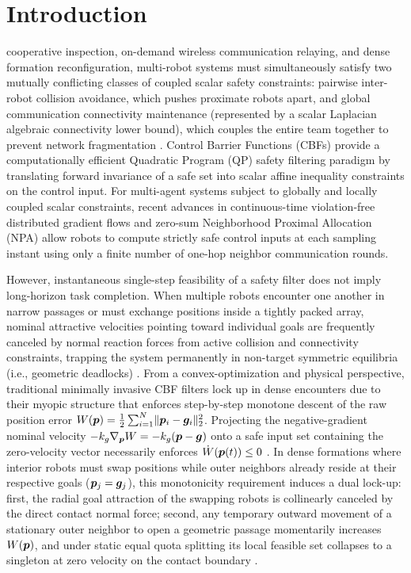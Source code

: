 \section{Introduction}\label{sec:intro}

 cooperative inspection, on-demand wireless communication relaying, and dense formation reconfiguration, multi-robot systems must simultaneously satisfy two mutually conflicting classes of coupled scalar safety constraints: pairwise inter-robot collision avoidance, which pushes proximate robots apart, and global communication connectivity maintenance (represented by a scalar Laplacian algebraic connectivity lower bound), which couples the entire team together to prevent network fragmentation \cite{yang2010decentralized,sabattini2013decentralized,ong2021connectivity}. Control Barrier Functions (CBFs) \cite{ames2017cbf,breeden2022sampled} provide a computationally efficient Quadratic Program (QP) safety filtering paradigm by translating forward invariance of a safe set into scalar affine inequality constraints on the control input. For multi-agent systems subject to globally and locally coupled scalar constraints, recent advances in continuous-time violation-free distributed gradient flows \cite{tan2025violationfree} and zero-sum Neighborhood Proximal Allocation (NPA) allow robots to compute strictly safe control inputs at each sampling instant using only a finite number of one-hop neighbor communication rounds.

However, instantaneous single-step feasibility of a safety filter does not imply long-horizon task completion. When multiple robots encounter one another in narrow passages or must exchange positions inside a tightly packed array, nominal attractive velocities pointing toward individual goals are frequently canceled by normal reaction forces from active collision and connectivity constraints, trapping the system permanently in non-target symmetric equilibria (i.e., geometric deadlocks) \cite{reis2021,grover2023deadlock,tan2024equilibria,mestres2026filters}. From a convex-optimization and physical perspective, traditional minimally invasive CBF filters lock up in dense encounters due to their myopic structure that enforces step-by-step monotone descent of the raw position error $W(\boldsymbol{p})=\frac12\sum_{i=1}^N\lVert\boldsymbol{p}_i-\boldsymbol{g}_i\rVert_2^2$. Projecting the negative-gradient nominal velocity $-k_g\nabla_{\boldsymbol{p}}W=-k_g(\boldsymbol{p}-\boldsymbol{g})$ onto a safe input set containing the zero-velocity vector necessarily enforces $\dot W(\boldsymbol{p}(t))\le 0$ \cite{allibhoy2024safegradient}. In dense formations where interior robots must swap positions while outer neighbors already reside at their respective goals ($\boldsymbol{p}_j=\boldsymbol{g}_j$), this monotonicity requirement induces a dual lock-up: first, the radial goal attraction of the swapping robots is collinearly canceled by the direct contact normal force; second, any temporary outward movement of a stationary outer neighbor to open a geometric passage momentarily increases $W(\boldsymbol{p})$, and under static equal quota splitting its local feasible set collapses to a singleton at zero velocity on the contact boundary \cite{karagoz2014navigation}.

